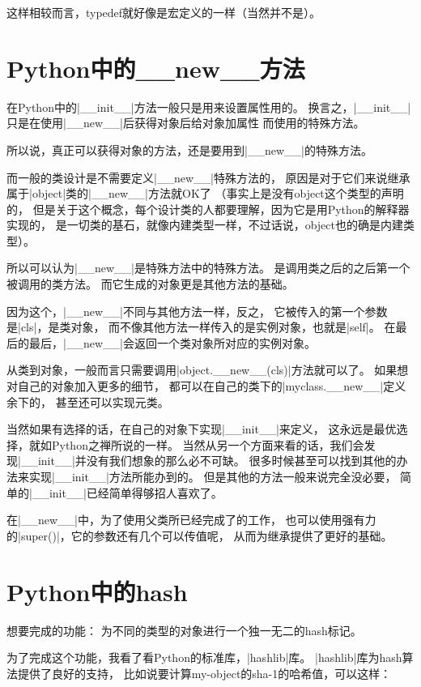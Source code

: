 这样相较而言，typedef就好像是宏定义的一样（当然并不是）。


\section{Python中的\_\_new\_\_方法}

在Python中的\vb|__init__|方法一般只是用来设置属性用的。
换言之，\vb|__init__|只是在使用\vb|__new__|后获得对象后给对象加属性
而使用的特殊方法。

所以说，真正可以获得对象的方法，还是要用到\vb|__new__|的特殊方法。

而一般的类设计是不需要定义\vb|__new__|特殊方法的，
原因是对于它们来说继承属于\vb|object|类的\vb|__new__|方法就OK了
（事实上是没有object这个类型的声明的，
但是关于这个概念，每个设计类的人都要理解，因为它是用Python的解释器实现的，
是一切类的基石，就像内建类型一样，不过话说，object也的确是内建类型）。

所以可以认为\vb|__new__|是特殊方法中的特殊方法。
是调用类之后的之后第一个被调用的类方法。
而它生成的对象更是其他方法的基础。

因为这个，\vb|__new__|不同与其他方法一样，反之，
它被传入的第一个参数是\vb|cls|，是类对象，
而不像其他方法一样传入的是实例对象，也就是\vb|self|。
在最后的最后，\vb|__new__|会返回一个类对象所对应的实例对象。

从类到对象，一般而言只需要调用\vb|object.__new__(cls)|方法就可以了。
如果想对自己的对象加入更多的细节，
都可以在自己的类下的\vb|myclass.__new__|定义余下的，
甚至还可以实现元类。

当然如果有选择的话，在自己的对象下实现\vb|__init__|来定义，
这永远是最优选择，就如Python之禅所说的一样。
当然从另一个方面来看的话，我们会发现\vb|__init__|并没有我们想象的那么必不可缺。
很多时候甚至可以找到其他的办法来实现\vb|__init__|方法所能办到的。
但是其他的方法一般来说完全没必要，
简单的\vb|__init__|已经简单得够招人喜欢了。

在\vb|__new__|中，为了使用父类所已经完成了的工作，
也可以使用强有力的\vb|super()|，它的参数还有几个可以传值呢，
从而为继承提供了更好的基础。


\section{Python中的hash}

想要完成的功能：
为不同的类型的对象进行一个独一无二的hash标记。

为了完成这个功能，我看了看Python的标准库，\vb|hashlib|库。
\vb|hashlib|库为hash算法提供了良好的支持，
比如说要计算my-object的sha-1的哈希值，可以这样：

